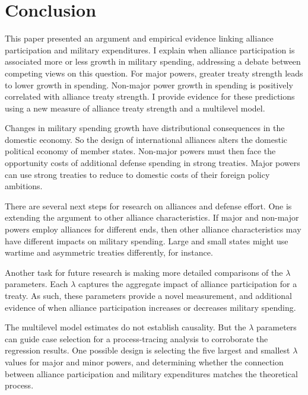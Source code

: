 \documentclass[12pt]{article}
\begin{document}
\section{Conclusion}


This paper presented an argument and empirical evidence linking alliance participation and military expenditures. 
I explain when alliance participation is associated more or less growth in military spending, addressing a debate between competing views on this question. 
For major powers, greater treaty strength leads to lower growth in spending. 
Non-major power growth in spending is positively correlated with alliance treaty strength. 
I provide evidence for these predictions using a new measure of alliance treaty strength and a multilevel model. 


Changes in military spending growth have distributional consequences in the domestic economy. 
So the design of international alliances alters the domestic political economy of member states. 
Non-major powers must then face the opportunity costs of additional defense spending in strong treaties.
Major powers can use strong treaties to reduce to domestic costs of their foreign policy ambitions.  


There are several next steps for research on alliances and defense effort. 
One is extending the argument to other alliance characteristics. 
If major and non-major powers employ alliances for different ends, then other alliance characteristics may have different impacts on military spending. 
Large and small states might use wartime and asymmetric treaties differently, for instance. 


Another task for future research is making more detailed comparisons of the $\lambda$ parameters. 
Each $\lambda$ captures the aggregate impact of alliance participation for a treaty.
As such, these parameters provide a novel measurement, and additional evidence of when alliance participation increases or decreases military spending. 


The multilevel model estimates do not establish causality. 
But the $\lambda$ parameters can guide case selection for a process-tracing analysis to corroborate the regression results.
One possible design is selecting the five largest and smallest $\lambda$ values for major and minor powers, and determining whether the connection between alliance participation and military expenditures matches the theoretical process.
\end{document}
